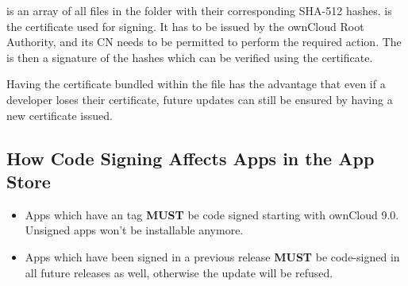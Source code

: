 \documentclass[letterpaper,10pt,english]{sphinxmanual}
\begin{document}
 is an array of all files in the folder with their corresponding
SHA-512 hashes.  is the certificate used for signing. It has to
be issued by the ownCloud Root Authority, and its CN needs to be permitted to
perform the required action. The  is then a signature of the hashes
which can be verified using the certificate.

Having the certificate bundled within the  file has the
advantage that even if a developer loses their certificate, future updates can
still be ensured by having a new certificate issued.


\subsection{How Code Signing Affects Apps in the App Store}
\label{app/code_signing:how-code-signing-affects-apps-in-the-app-store}\begin{itemize}
\item {} 
Apps which have an  tag \textbf{MUST} be code signed starting with
ownCloud 9.0. Unsigned  apps won't be installable anymore.

\item {} 
Apps which have been signed in a previous release \textbf{MUST} be code-signed in
all future releases as well, otherwise the update will be refused.

\end{itemize}
\end{document}

